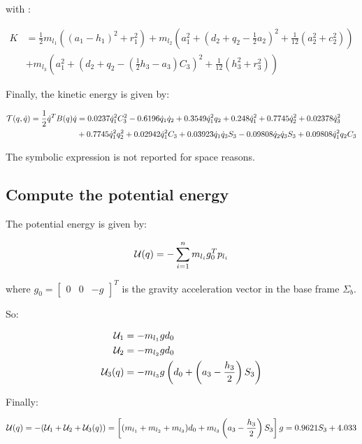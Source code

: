 with :

\begin{align*}
K&=\frac{1}{2}m_{l_1}\left((a_1-h_1)^2+r_1^2\right)+m_{l_2}\left(a_1^2+\left(d_2+q_2-\frac{1}{2}a_2\right)^2+\frac{1}{12}\left(a_2^2+c_2^2\right)\right)\\&+m_{l_3}\left(a_1^2 + \left(d_2+q_2-\left(\frac{1}{2}h_3-a_3\right)C_3\right)^2+\frac{1}{12}(h_3^2+r_3^2)\right)
\end{align*}

Finally, the kinetic energy is given by:

\begin{align*}
\mathcal{T}(q,\dot q) = \frac{1}{2}\dot q^TB(q)\dot q
&=0.0237\dot q_1^2C_3^2 - 0.6196\dot q_1\dot q_2 + 0.3549\dot q_1^2 q_2 + 0.248\dot q_1^2 + 0.7745\dot q_2^2 + 0.02378\dot q_3^2 \\&+ 0.7745\dot q_1^2q_2^2 + 0.02942\dot q_1^2C_3 + 0.03923\dot q_1 \dot q_3S_3 - 0.09808\dot q_2\dot q_3S_3 + 0.09808\dot q_1^2q_2C_3
\end{align*}

The symbolic expression is not reported for space reasons.

\subsection{Compute the potential energy}

The potential energy is given by:

\begin{equation*}
\mathcal{U}(q)=-\sum\limits_{i=1}^nm_{l_i}g_0^Tp_{l_i}
\end{equation*}

where $g_0=\begin{bmatrix}
0&0&-g
\end{bmatrix}^T$ is the gravity acceleration vector in the base frame $\Sigma_b$.

So:

\begin{align*}
\mathcal{U}_1&=-m_{l_1}gd_0\\
\mathcal{U}_2&=-m_{l_2}gd_0\\
\mathcal{U}_3(q)&=-m_{l_3}g\left(d_0+\left(a_3-\frac{h_3}{2}\right)S_3\right)
\end{align*}

Finally:

\begin{equation*}
\mathcal{U}(q) = -(\mathcal{U}_1+\mathcal{U}_2+\mathcal{U}_3(q))=\left[(m_{l_1}+m_{l_2}+m_{l_3})d_0+m_{l_3}\left(a_3-\frac{h_3}{2}\right)S_3\right]g = 0.9621S_3 + 4.033
\end{equation*}